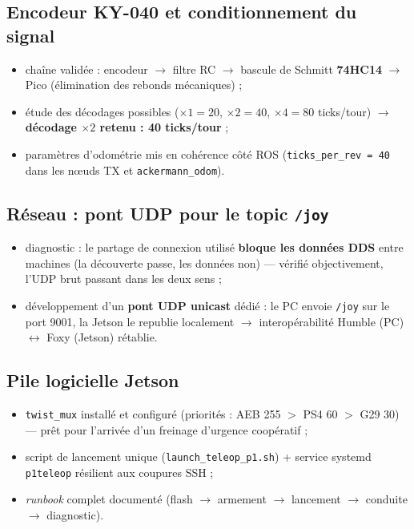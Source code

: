 \documentclass[11pt,a4paper]{article}
\begin{document}
\subsection{Encodeur KY-040 et conditionnement du signal}
\begin{itemize}[itemsep=2pt]
  \item chaîne validée : encodeur $\rightarrow$ filtre RC $\rightarrow$ bascule de
        Schmitt \textbf{74HC14} $\rightarrow$ Pico (élimination des rebonds
        mécaniques) ;
  \item étude des décodages possibles ($\times 1 = 20$, $\times 2 = 40$,
        $\times 4 = 80$ ticks/tour) $\rightarrow$ \textbf{décodage $\times 2$
        retenu : 40 ticks/tour} ;
  \item paramètres d'odométrie mis en cohérence côté ROS
        (\texttt{ticks\_per\_rev = 40} dans les n\oe uds TX et
        \texttt{ackermann\_odom}).
\end{itemize}

\subsection{Réseau : pont UDP pour le topic \texttt{/joy}}
\begin{itemize}[itemsep=2pt]
  \item diagnostic : le partage de connexion utilisé \textbf{bloque les données
        DDS} entre machines (la découverte passe, les données non) --- vérifié
        objectivement, l'UDP brut passant dans les deux sens ;
  \item développement d'un \textbf{pont UDP unicast} dédié : le PC envoie
        \texttt{/joy} sur le port 9001, la Jetson le republie localement
        $\rightarrow$ interopérabilité Humble (PC) $\leftrightarrow$ Foxy (Jetson)
        rétablie.
\end{itemize}

\subsection{Pile logicielle Jetson}
\begin{itemize}[itemsep=2pt]
  \item \texttt{twist\_mux} installé et configuré (priorités : AEB 255 $>$ PS4 60
        $>$ G29 30) --- prêt pour l'arrivée d'un freinage d'urgence coopératif ;
  \item script de lancement unique (\texttt{launch\_teleop\_p1.sh}) + service
        systemd \texttt{p1teleop} résilient aux coupures SSH ;
  \item \emph{runbook} complet documenté (flash $\rightarrow$ armement
        $\rightarrow$ lancement $\rightarrow$ conduite $\rightarrow$ diagnostic).
\end{itemize}
\end{document}
